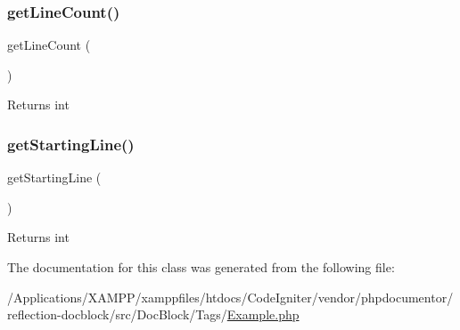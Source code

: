 \subsubsection{\texorpdfstring{get\+Line\+Count()}{getLineCount()}}
{\footnotesize\ttfamily get\+Line\+Count (\begin{DoxyParamCaption}{ }\end{DoxyParamCaption})}

\begin{DoxyReturn}{Returns}
int 
\end{DoxyReturn}
\mbox{\label{classphp_documentor_1_1_reflection_1_1_doc_block_1_1_tags_1_1_example_a59179ee45a85a9b98184c48a661716cf}} 
\subsubsection{\texorpdfstring{get\+Starting\+Line()}{getStartingLine()}}
{\footnotesize\ttfamily get\+Starting\+Line (\begin{DoxyParamCaption}{ }\end{DoxyParamCaption})}

\begin{DoxyReturn}{Returns}
int 
\end{DoxyReturn}


The documentation for this class was generated from the following file\+:\begin{DoxyCompactItemize}
\item 
/\+Applications/\+X\+A\+M\+P\+P/xamppfiles/htdocs/\+Code\+Igniter/vendor/phpdocumentor/reflection-\/docblock/src/\+Doc\+Block/\+Tags/\mbox{\hyperlink{phpdocumentor_2reflection-docblock_2src_2_doc_block_2_tags_2_example_8php}{Example.\+php}}\end{DoxyCompactItemize}
